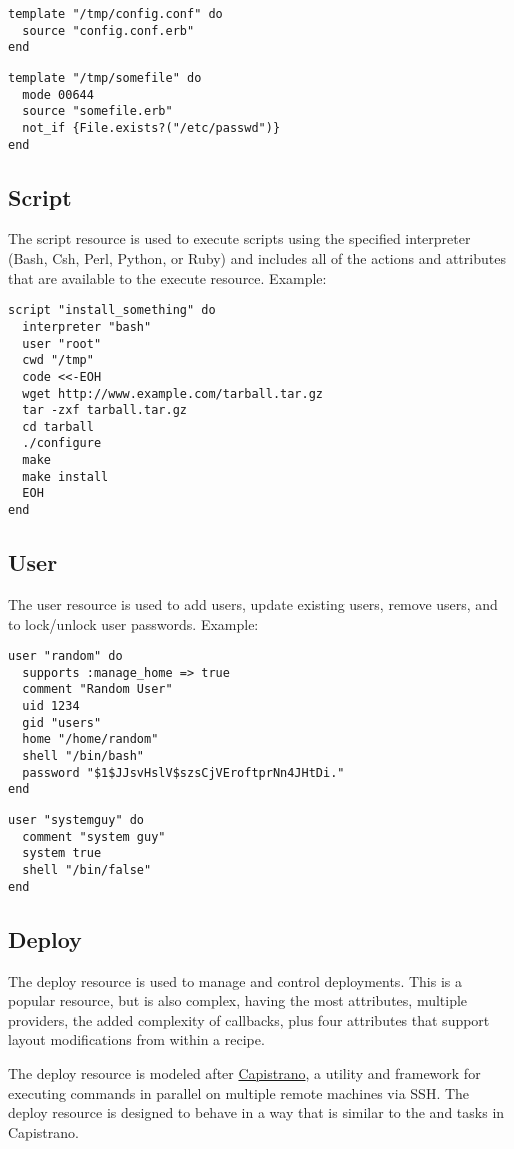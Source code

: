 \begin{lstlisting}[label=lst:cookbook-resources-cookbook-template1]
template "/tmp/config.conf" do
  source "config.conf.erb"
end
\end{lstlisting}

\begin{lstlisting}[label=lst:cookbook-resources-cookbook-template2]
template "/tmp/somefile" do
  mode 00644
  source "somefile.erb"
  not_if {File.exists?("/etc/passwd")}
end
\end{lstlisting}

\subsection{Script}

The script resource is used to execute scripts using the specified interpreter (Bash, Csh, Perl, Python, or Ruby) and includes all of the actions and attributes that are available to the execute resource. Example:

\begin{lstlisting}[label=lst:cookbook-resources-cookbook-script1]
script "install_something" do
  interpreter "bash"
  user "root"
  cwd "/tmp"
  code <<-EOH
  wget http://www.example.com/tarball.tar.gz
  tar -zxf tarball.tar.gz
  cd tarball
  ./configure
  make
  make install
  EOH
end
\end{lstlisting}

\subsection{User}

The user resource is used to add users, update existing users, remove users, and to lock/unlock user passwords. Example:

\begin{lstlisting}[label=lst:cookbook-resources-cookbook-user1]
user "random" do
  supports :manage_home => true
  comment "Random User"
  uid 1234
  gid "users"
  home "/home/random"
  shell "/bin/bash"
  password "$1$JJsvHslV$szsCjVEroftprNn4JHtDi."
end
\end{lstlisting}

\begin{lstlisting}[label=lst:cookbook-resources-cookbook-user2]
user "systemguy" do
  comment "system guy"
  system true
  shell "/bin/false"
end
\end{lstlisting}

\subsection{Deploy}

The deploy resource is used to manage and control deployments. This is a popular resource, but is also complex, having the most attributes, multiple providers, the added complexity of callbacks, plus four attributes that support layout modifications from within a recipe.

The deploy resource is modeled after \href{http://capistranorb.com/}{Capistrano}, a utility and framework for executing commands in parallel on multiple remote machines via SSH. The deploy resource is designed to behave in a way that is similar to the  and  tasks in Capistrano.